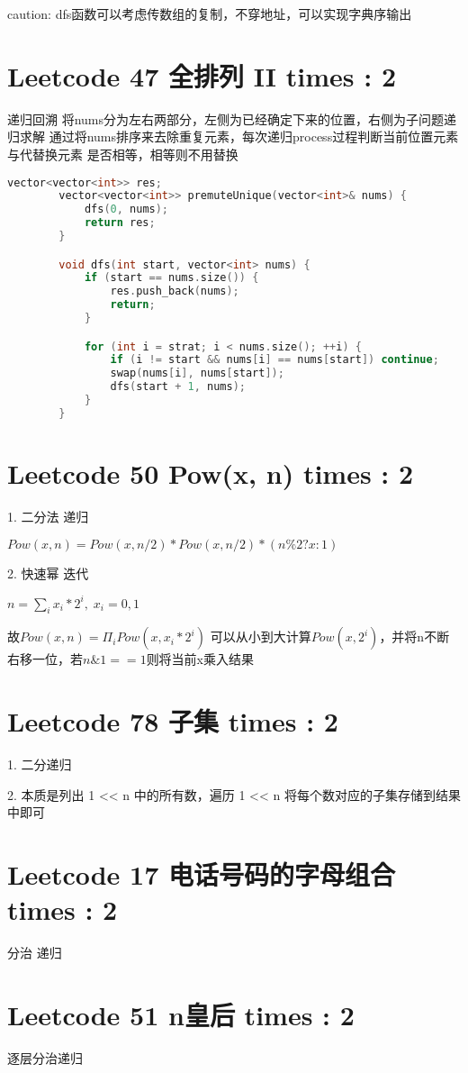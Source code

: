 \documentclass[UTF8]{ctexart}
\begin{document}
caution: dfs函数可以考虑传数组的复制，不穿地址，可以实现字典序输出

\section{Leetcode 47 全排列 II times : 2}
递归回溯
将nums分为左右两部分，左侧为已经确定下来的位置，右侧为子问题递归求解
通过将nums排序来去除重复元素，每次递归process过程判断当前位置元素与代替换元素
是否相等，相等则不用替换
\begin{framed}
	\begin{lstlisting}[language=C++]
		vector<vector<int>> res;
		vector<vector<int>> premuteUnique(vector<int>& nums) {
			dfs(0, nums);
			return res;
		}

		void dfs(int start, vector<int> nums) {
			if (start == nums.size()) {
				res.push_back(nums);
				return;
			}

			for (int i = strat; i < nums.size(); ++i) {
				if (i != start && nums[i] == nums[start]) continue;
				swap(nums[i], nums[start]);
				dfs(start + 1, nums);
			}
		}
	\end{lstlisting}
\end{framed}

\section{Leetcode 50 Pow(x, n) times : 2}
1. 二分法   递归

$Pow(x, n) = Pow(x, n/2) * Pow(x, n/2) * (n \% 2 ? x : 1)$

2. 快速幂   迭代

$n = \sum_i x_i * 2^i, \; x_i = 0, 1$

故$Pow(x, n) = \Pi_i Pow(x, x_i * 2^i)$
可以从小到大计算$Pow(x, 2^i)$，并将n不断右移一位，若$n \& 1 == 1$则将当前x乘入结果

\section{Leetcode 78 子集 times : 2}
1. 二分递归

2. 本质是列出 1 << n 中的所有数，遍历 1 << n 将每个数对应的子集存储到结果中即可

\section{Leetcode 17 电话号码的字母组合 times : 2}
分治 递归

\section{Leetcode 51 n皇后 times : 2}
逐层分治递归
\end{document}
